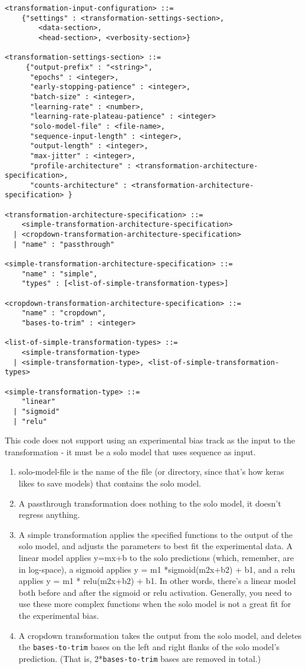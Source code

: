 \documentclass{article}
\begin{document}
\begin{lstlisting}
<transformation-input-configuration> ::=
    {"settings" : <transformation-settings-section>, 
        <data-section>, 
        <head-section>, <verbosity-section>}

<transformation-settings-section> ::=
     {"output-prefix" : "<string>", 
      "epochs" : <integer>, 
      "early-stopping-patience" : <integer>, 
      "batch-size" : <integer>, 
      "learning-rate" : <number>,
      "learning-rate-plateau-patience" : <integer> 
      "solo-model-file" : <file-name>,
      "sequence-input-length" : <integer>,
      "output-length" : <integer>,
      "max-jitter" : <integer>,
      "profile-architecture" : <transformation-architecture-specification>, 
      "counts-architecture" : <transformation-architecture-specification> } 

<transformation-architecture-specification> ::= 
    <simple-transformation-architecture-specification>
  | <cropdown-transformation-architecture-specification>
  | "name" : "passthrough"

<simple-transformation-architecture-specification> ::= 
    "name" : "simple",
    "types" : [<list-of-simple-transformation-types>]

<cropdown-transformation-architecture-specification> ::=
    "name" : "cropdown", 
    "bases-to-trim" : <integer>

<list-of-simple-transformation-types> ::= 
    <simple-transformation-type>
  | <simple-transformation-type>, <list-of-simple-transformation-types>

<simple-transformation-type> ::= 
    "linear"
  | "sigmoid"
  | "relu"

\end{lstlisting}

This code does not support using an experimental bias track as the input to the 
transformation - it must be a solo model that uses sequence as input.
\begin{enumerate}
    \item solo-model-file is the name of the file (or directory, since that's how keras likes to save models) that contains the solo model. 
    \item A passthrough transformation does nothing to the solo model, it doesn't regress anything. 
    \item A simple transformation applies the specified functions to the output of the solo model, and adjusts the parameters to best fit the experimental data. A linear model applies y=mx+b to the solo predictions (which, remember, are in log-space), a sigmoid applies y = m1 *sigmoid(m2x+b2) + b1, and a relu applies y = m1 * relu(m2x+b2) + b1. In other words, there's a linear model both before and after the sigmoid or relu activation. Generally, you need to use these more complex functions when the solo model is not a great fit for the experimental bias. 
    \item A cropdown transformation takes the output from the solo model, and deletes the \texttt{bases-to-trim} bases on the left and right flanks of the solo model's prediction. (That is, 2*\texttt{bases-to-trim} bases are removed in total.)
\end{enumerate}
\end{document}
